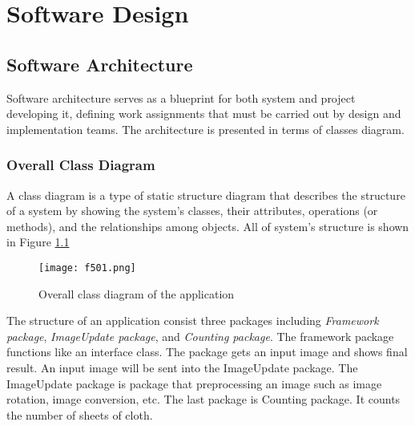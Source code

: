 
\chapter{Software Design} %

\label{Chapter5} %



\section{Software Architecture}
Software architecture serves as a blueprint for both system and project developing it, defining work assignments that must be carried out by design and implementation teams. The architecture is presented in terms of classes diagram.

\subsection{Overall Class Diagram }

A class diagram is a type of static structure diagram that describes the structure of a system by showing the system's classes, their attributes, operations (or methods), and the relationships among objects. All of system’s structure is shown in Figure \ref{fig:f501}
\begin{figure}[t]
	\centering
	\texttt{[image: f501.png]}
	\caption{Overall class diagram of the application}
	\label{fig:f501}
\end{figure}

The structure of an application consist three packages including \textit{Framework package}, \textit{ImageUpdate package}, and \textit{Counting package}. The framework package functions like an interface class. The package gets an input image and shows final result. An input image will be sent into the ImageUpdate package. The ImageUpdate package is package that preprocessing an image such as image rotation, image conversion, etc. The last package is Counting package. It counts the number of sheets of cloth.
